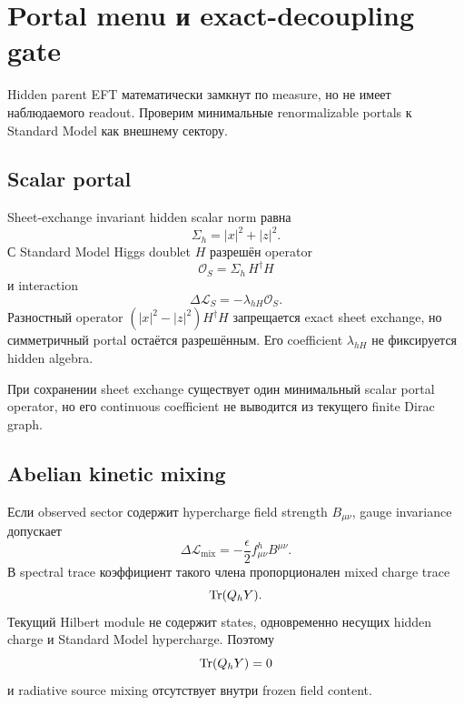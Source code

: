 \chapter{Portal menu и exact-decoupling gate}

Hidden parent EFT математически замкнут по measure, но не имеет
наблюдаемого readout. Проверим минимальные renormalizable portals к
Standard Model как внешнему сектору.

\section{Scalar portal}

Sheet-exchange invariant hidden scalar norm равна
\begin{equation}
 \Sigma_h=|x|^2+|z|^2.
\end{equation}
С Standard Model Higgs doublet \(H\) разрешён operator
\begin{equation}
 \mathcal O_S
 =
 \Sigma_h\,H^\dagger H
\end{equation}
и interaction
\begin{equation}
 \Delta\mathcal L_S
 =
 -\lambda_{hH}\mathcal O_S.
\end{equation}
Разностный operator
\((|x|^2-|z|^2)H^\dagger H\) запрещается exact sheet exchange, но
симметричный portal остаётся разрешённым. Его coefficient
\(\lambda_{hH}\) не фиксируется hidden algebra.

\begin{proposition}
При сохранении sheet exchange существует один минимальный scalar portal
operator, но его continuous coefficient не выводится из текущего
finite Dirac graph.
\end{proposition}

\section{Abelian kinetic mixing}

Если observed sector содержит hypercharge field strength
\(B_{\mu\nu}\), gauge invariance допускает
\begin{equation}
 \Delta\mathcal L_{\mathrm{mix}}
 =
 -\frac{\epsilon}{2}
 f_{\mu\nu}^{h}B^{\mu\nu}.
\end{equation}
В spectral trace коэффициент такого члена пропорционален mixed charge
trace
\begin{equation}
 \operatorname{Tr}(Q_hY).
\end{equation}
Текущий Hilbert module не содержит states, одновременно несущих hidden
charge и Standard Model hypercharge. Поэтому
\begin{equation}
 \operatorname{Tr}(Q_hY)=0
\end{equation}
и radiative source mixing отсутствует внутри frozen field content.

